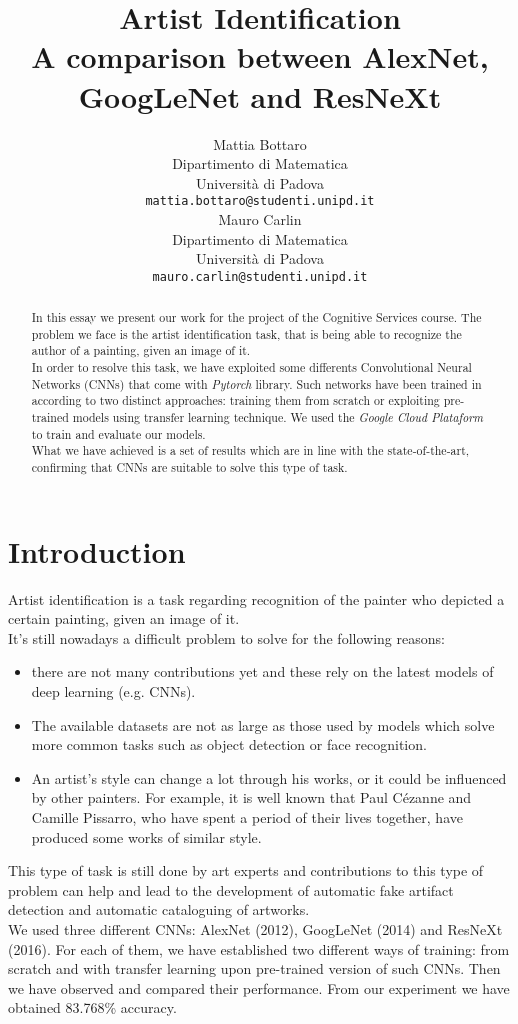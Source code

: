 \documentclass{article}
\title{Artist Identification	\\  A comparison between AlexNet, GoogLeNet and ResNeXt}
\author{
  Mattia Bottaro \\
  Dipartimento  di Matematica\\
  Università di Padova \\
  \texttt{mattia.bottaro@studenti.unipd.it} \\
   \And
  Mauro Carlin \\
Dipartimento  di Matematica\\
Università di Padova \\
\texttt{mauro.carlin@studenti.unipd.it} \\
}
\begin{document}
\maketitle

\begin{abstract}
	In this essay we present our work for the project of the Cognitive Services course.
	The problem we face is the artist identification task, that is being able to recognize the author of a painting, given an image of it.\\
	In order to resolve this task, we have exploited some differents Convolutional Neural Networks (CNNs) that come with \textit{Pytorch} library. Such networks have been trained in according to two distinct approaches: training them from scratch or exploiting pre-trained models using transfer learning technique. We used the \textit{Google Cloud Plataform} to train and evaluate our models.\\
	What we have achieved is a set of results which are in line with the  state-of-the-art, confirming that CNNs are suitable to solve this type of task.
\end{abstract}




\section{Introduction}
Artist identification is a task regarding recognition of the painter who depicted a certain painting, given an image of it.\\
It's still nowadays a difficult problem to solve for the following reasons:
\begin{itemize}
	\item there are not many contributions yet and these rely on the latest models of deep learning (e.g. CNNs). 
	\item The available datasets are not as large as those used by models which solve more common tasks such as object detection or face recognition.
	\item An artist's style can change a lot through his works, or it could be influenced by other painters. For example, it is well known that Paul Cézanne and Camille Pissarro, who have spent a period of their lives together, have produced some works of similar style.
\end{itemize}
This type of task is still done by art experts and contributions to this type of problem can help and lead to the development of automatic fake artifact detection and automatic cataloguing of artworks.\\
We used three different CNNs: AlexNet (2012), GoogLeNet (2014) and ResNeXt (2016). For each of them, we have established two different ways of training: from scratch and with transfer learning  upon pre-trained version of such CNNs. Then we have observed and compared their performance. From our experiment we have obtained 83.768\% accuracy.\\
\end{document}
